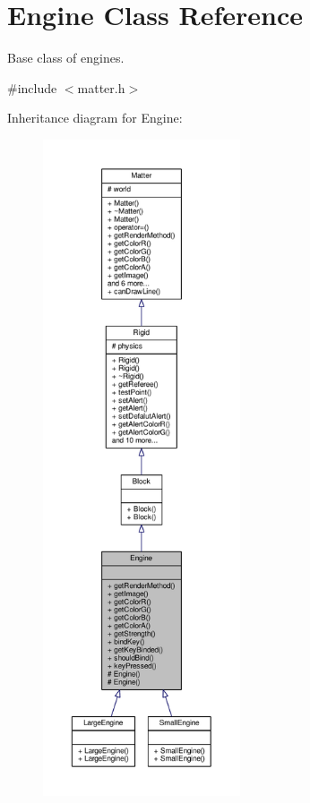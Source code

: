 \hypertarget{classEngine}{}\section{Engine Class Reference}
\label{classEngine}


Base class of engines.  




{\ttfamily \#include $<$matter.\+h$>$}



Inheritance diagram for Engine\+:\nopagebreak
\begin{figure}[H]
\begin{center}
\leavevmode
\includegraphics[height=550pt]{classEngine__inherit__graph}
\end{center}
\end{figure}


